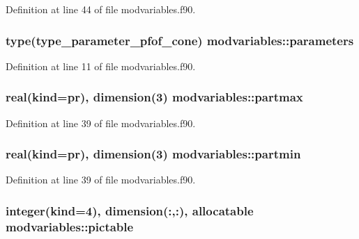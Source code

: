 Definition at line 44 of file modvariables.\+f90.

\subsubsection[{\texorpdfstring{parameters}{parameters}}]{\setlength{\rightskip}{0pt plus 5cm}type({\bf type\+\_\+parameter\+\_\+pfof\+\_\+cone}) modvariables\+::parameters}\hypertarget{namespacemodvariables_a3a05eb7a0d11075c67b3f7c927170b48}{}\label{namespacemodvariables_a3a05eb7a0d11075c67b3f7c927170b48}


Definition at line 11 of file modvariables.\+f90.

\subsubsection[{\texorpdfstring{partmax}{partmax}}]{\setlength{\rightskip}{0pt plus 5cm}real(kind=pr), dimension(3) modvariables\+::partmax}\hypertarget{namespacemodvariables_abeabad3e2598f3abb4a4fa74adca7743}{}\label{namespacemodvariables_abeabad3e2598f3abb4a4fa74adca7743}


Definition at line 39 of file modvariables.\+f90.

\subsubsection[{\texorpdfstring{partmin}{partmin}}]{\setlength{\rightskip}{0pt plus 5cm}real(kind=pr), dimension(3) modvariables\+::partmin}\hypertarget{namespacemodvariables_a70ddcf7f533c219df5c249774ff81df1}{}\label{namespacemodvariables_a70ddcf7f533c219df5c249774ff81df1}


Definition at line 39 of file modvariables.\+f90.

\subsubsection[{\texorpdfstring{pictable}{pictable}}]{\setlength{\rightskip}{0pt plus 5cm}integer(kind=4), dimension(\+:,\+:), allocatable modvariables\+::pictable}\hypertarget{namespacemodvariables_aa09a585a04de1f8fba311a2f440db992}{}\label{namespacemodvariables_aa09a585a04de1f8fba311a2f440db992}


